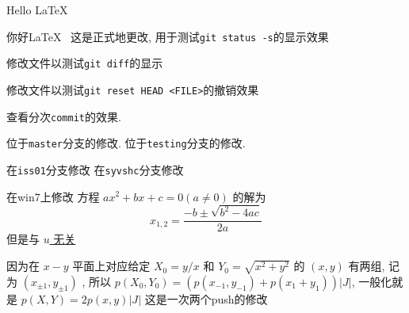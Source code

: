 \documentclass{ctexart}
\begin{document}
	Hello \LaTeX~

	你好\LaTeX~ %
	这是正式地更改, 用于测试\verb|git status -s|的显示效果

	修改文件以测试\verb|git diff|的显示

	修改文件以测试\verb|git reset HEAD <FILE>|的撤销效果

	查看分次\verb|commit|的效果. 

	位于\verb|master|分支的修改. 
	位于\verb|testing|分支的修改. 
	
	在\verb|iss01|分支修改
	在\verb|syvshc|分支修改

	在win7上修改
	方程 $ ax^{2}+bx+c=0(a\ne 0) $ 的解为
	\[
		x_{1, 2}=\frac{-b\pm\sqrt{b^{2}-4ac}}{2a}
	\]
	但是与 \uline{$ u $ 无关}

	因为在 $ x-y $ 平面上对应给定 $ X_{0}=y/x $ 和 $ Y_{0}=\sqrt{x^{2}+y^{2}} $ 的 $ (x, y) $ 有两组, 记为 $ (x_{\pm1}, y_{\pm1}) $ , 所以 $ p(X_{0}, Y_{0})=(p(x_{-1}, y_{-1})+p(x_{1}+y_{1}))|J| $, 一般化就是 $ p(X, Y)=2p(x, y)|J| $
	这是一次两个push的修改
\end{document}

